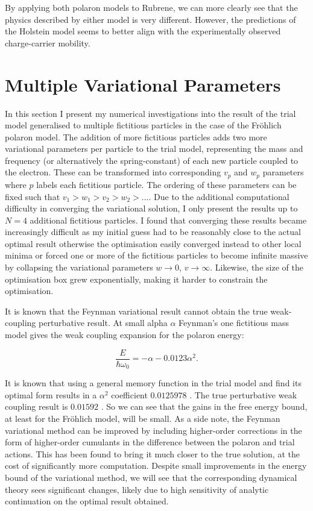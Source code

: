 By applying both polaron models to Rubrene, we can more clearly see that the physics described by either model is very different. However, the predictions of the Holstein model seems to better align with the experimentally observed charge-carrier mobility.

\section{Multiple Variational Parameters}

In this section I present my numerical investigations into the result of the trial model generalised to multiple fictitious particles in the case of the Fr\"ohlich polaron model. The addition of more fictitious particles adds two more variational parameters per particle to the trial model, representing the mass and frequency (or alternatively the spring-constant) of each new particle coupled to the electron. These can be transformed into corresponding $v_p$ and $w_p$ parameters where $p$ labels each fictitious particle. The ordering of these parameters can be fixed such that $v_1 > w_1 > v_2 > w_2 > ...$. Due to the additional computational difficulty in converging the variational solution, I only present the results up to $N=4$ additional fictitious particles. I found that converging these results became increasingly difficult as my initial guess had to be reasonably close to the actual optimal result otherwise the optimisation easily converged instead to other local minima or forced one or more of the fictitious particles to become infinite massive by collapsing the variational parameters $w \to 0$, $v \to \infty$. Likewise, the size of the optimisation box grew exponentially, making it harder to constrain the optimisation.
\newline

It is known that the Feynman variational result cannot obtain the true weak-coupling perturbative result. At small alpha $\alpha$ Feynman's one fictitious mass model gives the weak coupling expansion for the polaron energy:

\begin{equation} \label{eqn:weakcoupling}
    \frac{E}{\hbar\omega_0} = -\alpha - 0.0123 \alpha^2.
\end{equation}

It is known that using a general memory function in the trial model and find its optimal form results in a $\alpha^2$ coefficient $0.0125978$ \cite{Rosenfelder2001}. The true perturbative weak coupling result is $0.01592$ \cite{Rosenfelder2001}. So we can see that the gains in the free energy bound, at least for the Fr\"ohlich model, will be small. As a side note, the Feynman variational method can be improved by including higher-order corrections in the form of higher-order cumulants in the difference between the polaron and trial actions. This has been found to bring it much closer to the true solution, at the cost of significantly more computation. Despite small improvements in the energy bound of the variational method, we will see that the corresponding dynamical theory sees significant changes, likely due to high sensitivity of analytic continuation on the optimal result obtained.

